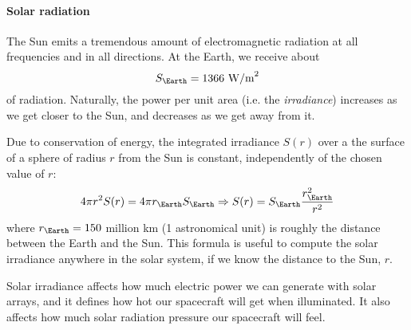 \paragraph{Solar radiation}

The Sun emits a tremendous amount of electromagnetic radiation at all 
frequencies and in all directions. At the Earth, we receive about
%
\begin{equation}
S_\Earth = 1366 \mbox{ W/m}^2
\end{equation}
%
of radiation. Naturally, the power per unit area (i.e. the \emph{irradiance})
increases as we get closer to the Sun, and decreases as we get away from it.

Due to conservation of energy, the integrated irradiance $S(r)$ over a the 
surface of a sphere of radius $r$ from the Sun is constant, independently of 
the chosen value of $r$:
%
\begin{equation}
4\pi r^2 S(r) = 4\pi r_\Earth S_\Earth \Rightarrow 
S(r)=S_\Earth \frac{r_\Earth^2}{r^2}
\end{equation}
%
where $r_\Earth = 150$ million km (1 astronomical unit) is roughly the 
distance between the Earth and the Sun. This formula is useful to compute the 
solar irradiance anywhere in the solar system, if we know the distance to the 
Sun, $r$.

Solar irradiance affects how much electric power we can generate with solar 
arrays, and it defines how hot our spacecraft will get when illuminated.
It also affects how much solar radiation pressure our spacecraft will feel.




